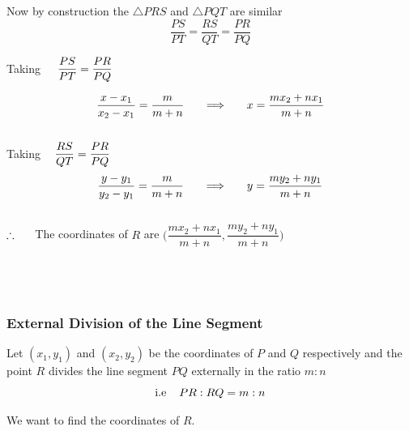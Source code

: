 \documentclass[11pt,a4paper]{article}
\begin{document}
Now by construction the $\triangle PRS$ and $\triangle PQT$ are similar
$$\dfrac{PS}{PT}= \dfrac{RS}{QT} = \dfrac{PR}{PQ}$$


Taking $\hspace{0.4cm}\dfrac{PS}{PT} = \dfrac{PR}{PQ}$

$$\dfrac{x - x_1}{x_2 - x_1} = \dfrac{m}{m + n}\hspace{0.5cm}\implies \hspace{0.5cm} x = \dfrac{mx_2 + nx_1}{m + n}$$\\


Taking $\hspace{0.3cm}\dfrac{RS}{QT}= \dfrac{PR}{PQ}$
$$\dfrac{y - y_1}{y_2 - y_1} = \dfrac{m}{m + n} \hspace{0.5cm} \implies \hspace{0.5cm} y = \dfrac{my_2 + ny_1}{m + n}$$\\




$\therefore\hspace{0.5cm}$ The coordinates of $R$ are \hspace{0.2cm}$\Bigg(\dfrac{mx_2 + nx_1}{m + n}, \dfrac{my_2 + ny_1}{m + n}\Bigg)$\\\\\\\\








\subsubsection{External Division of the Line Segment}

Let $(x_1,y_1)$ and $(x_2,y_2)$ be the coordinates of $P$ and $Q$ respectively and the point $R$ divides the line segment $PQ$ externally in the ratio $m: n$ $$\text{i.e}\hspace{0.4cm} PR : RQ = m:n$$

We want to find the coordinates of $R$.\\
\end{document}
